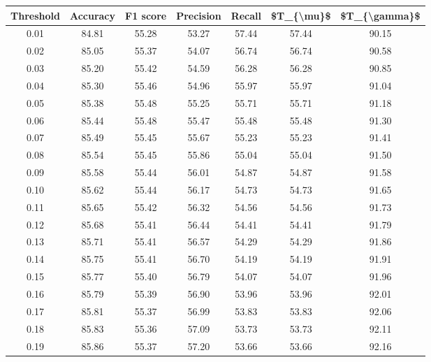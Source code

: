 \begin{tabular}{|c|c|c|c|c|c|c|}
\hline
 Threshold &  Accuracy &  F1 score &  Precision &  Recall &  \$T\_\{\textbackslash mu\}\$ &  \$T\_\{\textbackslash gamma\}\$ \\
\hline
      0.01 &     84.81 &     55.28 &      53.27 &   57.44 &      57.44 &         90.15 \\
      0.02 &     85.05 &     55.37 &      54.07 &   56.74 &      56.74 &         90.58 \\
      0.03 &     85.20 &     55.42 &      54.59 &   56.28 &      56.28 &         90.85 \\
      0.04 &     85.30 &     55.46 &      54.96 &   55.97 &      55.97 &         91.04 \\
      0.05 &     85.38 &     55.48 &      55.25 &   55.71 &      55.71 &         91.18 \\
      0.06 &     85.44 &     55.48 &      55.47 &   55.48 &      55.48 &         91.30 \\
      0.07 &     85.49 &     55.45 &      55.67 &   55.23 &      55.23 &         91.41 \\
      0.08 &     85.54 &     55.45 &      55.86 &   55.04 &      55.04 &         91.50 \\
      0.09 &     85.58 &     55.44 &      56.01 &   54.87 &      54.87 &         91.58 \\
      0.10 &     85.62 &     55.44 &      56.17 &   54.73 &      54.73 &         91.65 \\
      0.11 &     85.65 &     55.42 &      56.32 &   54.56 &      54.56 &         91.73 \\
      0.12 &     85.68 &     55.41 &      56.44 &   54.41 &      54.41 &         91.79 \\
      0.13 &     85.71 &     55.41 &      56.57 &   54.29 &      54.29 &         91.86 \\
      0.14 &     85.75 &     55.41 &      56.70 &   54.19 &      54.19 &         91.91 \\
      0.15 &     85.77 &     55.40 &      56.79 &   54.07 &      54.07 &         91.96 \\
      0.16 &     85.79 &     55.39 &      56.90 &   53.96 &      53.96 &         92.01 \\
      0.17 &     85.81 &     55.37 &      56.99 &   53.83 &      53.83 &         92.06 \\
      0.18 &     85.83 &     55.36 &      57.09 &   53.73 &      53.73 &         92.11 \\
      0.19 &     85.86 &     55.37 &      57.20 &   53.66 &      53.66 &         92.16 \\

\end{tabular}
